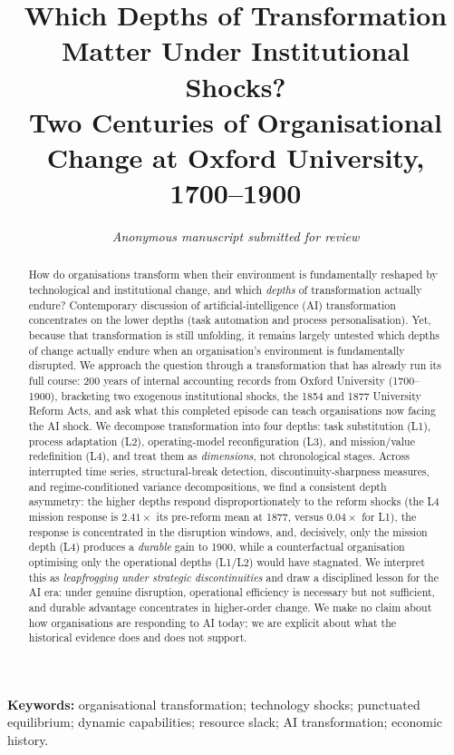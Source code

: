 \documentclass[11pt]{article}
\title{\bfseries Which Depths of Transformation Matter Under Institutional Shocks?\\[3pt]
\large Two Centuries of Organisational Change at Oxford University, 1700--1900}
\author{\normalsize\itshape Anonymous manuscript submitted for review}
\date{}
\begin{document}
\maketitle
\thispagestyle{fancy}

\begin{abstract}
\noindent How do organisations transform when their environment is fundamentally reshaped by
technological and institutional change, and which \emph{depths} of transformation actually
endure? Contemporary discussion of artificial-intelligence (AI) transformation concentrates on
the lower depths (task automation and process personalisation). Yet, because that
transformation is still unfolding, it remains largely untested which depths of change actually
endure when an organisation's environment is fundamentally disrupted. We approach the question
through a transformation that has already run its full course: 200 years of internal accounting
records from Oxford University (1700--1900), bracketing two exogenous institutional shocks, the
1854 and 1877 University Reform Acts, and ask what this completed episode can teach organisations
now facing the AI shock. We decompose transformation into four depths: task substitution (L1), process adaptation (L2),
operating-model reconfiguration (L3), and mission/value redefinition (L4), and treat them as
\emph{dimensions}, not chronological stages. Across interrupted time series, structural-break
detection, discontinuity-sharpness measures, and regime-conditioned variance decompositions, we
find a consistent depth asymmetry: the higher depths respond disproportionately to the reform
shocks (the L4 mission response is $2.41\times$ its pre-reform mean at 1877, versus $0.04\times$
for L1), the response is concentrated in the disruption windows, and, decisively, only the
mission depth (L4) produces a \emph{durable} gain to 1900, while a counterfactual organisation
optimising only the operational depths (L1/L2) would have stagnated. We interpret this as
\emph{leapfrogging under strategic discontinuities} and draw a disciplined lesson for the AI era:
under genuine disruption, operational efficiency is necessary but not sufficient, and durable
advantage concentrates in higher-order change. We make no claim about how organisations are
responding to AI today; we are explicit about what the historical evidence does and does not
support.
\end{abstract}

\smallskip
\noindent\textbf{Keywords:} organisational transformation; technology shocks; punctuated
equilibrium; dynamic capabilities; resource slack; AI transformation; economic history.
\end{document}
